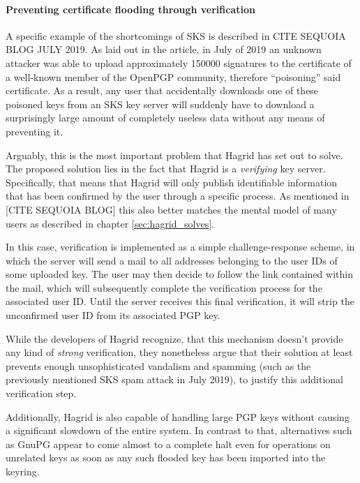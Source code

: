 \paragraph{Preventing certificate flooding through verification}
A specific example of the shortcomings of SKS is described in CITE SEQUOIA BLOG JULY 2019. 
As laid out in the article, in July of 2019 an unknown attacker was able to upload approximately 150000 signatures to the certificate of a well-known member of the OpenPGP community, therefore ``poisoning'' said certificate. As a result, any user that accidentally downloads one of these poisoned keys from an SKS key server will suddenly have to download a surprisingly large amount of completely useless data without any means of preventing it.

Arguably, this is the most important problem that Hagrid has set out to solve. The proposed solution lies in the fact that Hagrid is a \emph{verifying} key server. Specifically, that means that Hagrid will only publish identifiable information that has been confirmed by the user through a specific process. As mentioned in [CITE SEQUOIA BLOG] this also better matches the mental model of many users as described in chapter \ref{sec:hagrid_solves}.

In this case, verification is implemented as a simple challenge-response scheme, in which the server will send a mail to all addresses belonging to the user IDs of some uploaded key. The user may then decide to follow the link contained within the mail, which will subsequently complete the verification process for the associated user ID.
Until the server receives this final verification, it will strip the unconfirmed user ID from its associated PGP key.

While the developers of Hagrid recognize, that this mechanism doesn't provide any kind of \emph{strong} verification, they nonetheless argue that their solution at least prevents enough unsophisticated vandalism and spamming (such as the previously mentioned SKS spam attack in July 2019), to justify this additional verification step.

Additionally, Hagrid is also capable of handling large PGP keys without causing a significant slowdown of the entire system. In contrast to that, alternatives such  as GnuPG appear to come almost to a complete halt even for operations on unrelated keys as soon as any such flooded key has been imported into the keyring. 
